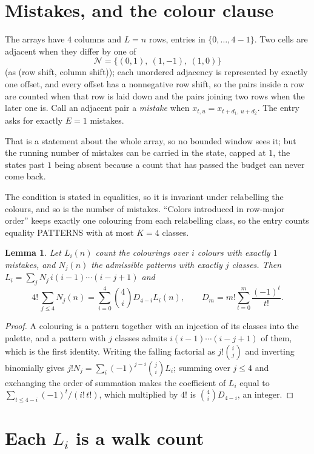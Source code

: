 \documentclass[11pt,a4paper]{article}
\theoremstyle{plain}
\newtheorem{lemma}[theorem]{Lemma}
\theoremstyle{definition}
\begin{document}
\section{Mistakes, and the colour clause}

The arrays have $4$ columns and $L=n$ rows, entries in $\{0,\dots,4-1\}$.
Two cells are adjacent when they differ by one of
\[
\mathcal N=\{(0,1),\ (1,-1),\ (1,0)\}
\]
(as (row shift, column shift)); each unordered adjacency is represented by exactly one
offset, and every offset has a nonnegative row shift, so the pairs inside a row are
counted when that row is laid down and the pairs joining two rows when the later one
is. Call an adjacent pair a \emph{mistake} when $x_{t,u}=x_{t+d_1,\,u+d_2}$. The entry asks for exactly
$E=1$ mistakes.

That is a statement about the whole array, so no bounded window sees it; but the running
number of mistakes can be carried in the state, capped at $1$, the states past $1$ being
absent because a count that has passed the budget can never come back.

The condition is stated in equalities, so it is invariant under relabelling the colours, and
so is the number of mistakes. ``Colors introduced in row-major order'' keeps exactly one
colouring from each relabelling class, so the entry counts equality PATTERNS with at most
$K=4$ classes.

\begin{lemma}\label{lem:inv}
Let $L_i(n)$ count the colourings over $i$ colours with exactly $1$ mistakes, and $N_j(n)$
the admissible patterns with exactly $j$ classes. Then
$L_i=\sum_j N_j\,i(i-1)\cdots(i-j+1)$ and
\[
4!\,\sum_{j\le4}N_j(n)=\sum_{i=0}^{4}\binom{4}{i}D_{4-i}L_i(n),
\qquad D_m=m!\sum_{t=0}^{m}\frac{(-1)^t}{t!} .
\]
\end{lemma}

\begin{proof}
A colouring is a pattern together with an injection of its classes into the palette, and a
pattern with $j$ classes admits $i(i-1)\cdots(i-j+1)$ of them, which is the first identity.
Writing the falling factorial as $j!\binom{i}{j}$ and inverting binomially gives
$j!N_j=\sum_i(-1)^{j-i}\binom{j}{i}L_i$; summing over $j\le4$ and exchanging the order
of summation makes the coefficient of $L_i$ equal to $\sum_{t\le4-i}(-1)^t/(i!\,t!)$,
which multiplied by $4!$ is $\binom{4}{i}D_{4-i}$, an integer.
\end{proof}

\section{Each $L_i$ is a walk count}
\end{document}
